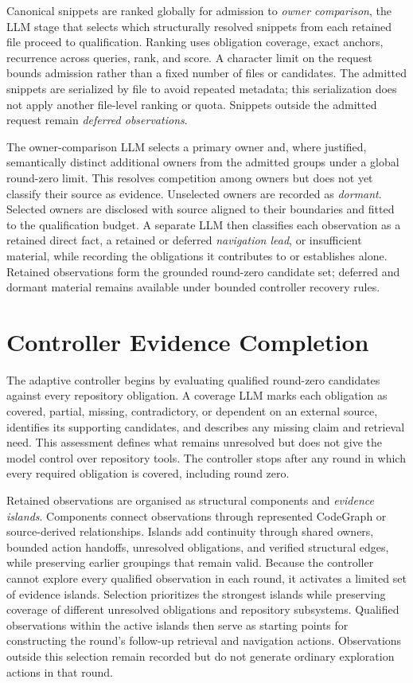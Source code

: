 Canonical snippets are ranked globally for admission to \emph{owner comparison}, the LLM stage that selects which structurally resolved snippets from each retained file proceed to qualification. Ranking uses obligation coverage, exact anchors, recurrence across queries, rank, and score. A character limit on the request bounds admission rather than a fixed number of files or candidates. The admitted snippets are serialized by file to avoid repeated metadata; this serialization does not apply another file-level ranking or quota. Snippets outside the admitted request remain \emph{deferred observations}.

The owner-comparison LLM selects a primary owner and, where justified, semantically distinct additional owners from the admitted groups under a global round-zero limit. This resolves competition among owners but does not yet classify their source as evidence. Unselected owners are recorded as \emph{dormant}. Selected owners are disclosed with source aligned to their boundaries and fitted to the qualification budget. A separate LLM then classifies each observation as a retained direct fact, a retained or deferred \emph{navigation lead}, or insufficient material, while recording the obligations it contributes to or establishes alone. Retained observations form the grounded round-zero candidate set; deferred and dormant material remains available under bounded controller recovery rules.

\section{Controller Evidence Completion}\label{sec:controller-evidence-completion}

The adaptive controller begins by evaluating qualified round-zero candidates against every repository obligation. A coverage LLM marks each obligation as covered, partial, missing, contradictory, or dependent on an external source, identifies its supporting candidates, and describes any missing claim and retrieval need. This assessment defines what remains unresolved but does not give the model control over repository tools. The controller stops after any round in which every required obligation is covered, including round zero.

Retained observations are organised as structural components and \emph{evidence islands}. Components connect observations through represented CodeGraph or source-derived relationships. Islands add continuity through shared owners, bounded action handoffs, unresolved obligations, and verified structural edges, while preserving earlier groupings that remain valid. Because the controller cannot explore every qualified observation in each round, it activates a limited set of evidence islands. Selection prioritizes the strongest islands while preserving coverage of different unresolved obligations and repository subsystems. Qualified observations within the active islands then serve as starting points for constructing the round's follow-up retrieval and navigation actions. Observations outside this selection remain recorded but do not generate ordinary exploration actions in that round.

